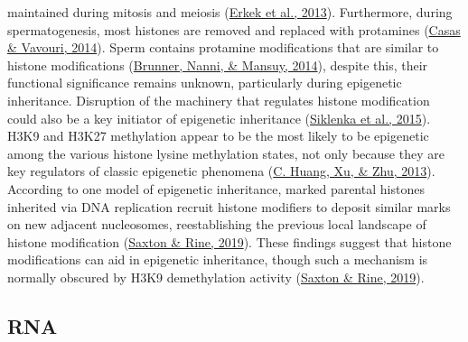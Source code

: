 \documentclass[12pt,twoside]{reedthesis}
\begin{document}
maintained during mitosis and meiosis (\protect\hyperlink{ref-erkek2013}{Erkek et al., 2013}). Furthermore, during
spermatogenesis, most histones are removed and replaced with protamines
(\protect\hyperlink{ref-casas2014}{Casas \& Vavouri, 2014}). Sperm contains protamine modifications that are similar to
histone modifications (\protect\hyperlink{ref-brunner2014}{Brunner, Nanni, \& Mansuy, 2014}), despite this, their functional
significance remains unknown, particularly during epigenetic
inheritance. Disruption of the machinery that regulates histone
modification could also be a key initiator of epigenetic inheritance
(\protect\hyperlink{ref-siklenka2015}{Siklenka et al., 2015}). H3K9 and H3K27 methylation appear to be the most likely
to be epigenetic among the various histone lysine methylation states,
not only because they are key regulators of classic epigenetic phenomena
(\protect\hyperlink{ref-huang2013}{C. Huang, Xu, \& Zhu, 2013}). According to one model of epigenetic inheritance, marked
parental histones inherited via DNA replication recruit histone
modifiers to deposit similar marks on new adjacent nucleosomes,
reestablishing the previous local landscape of histone modification
(\protect\hyperlink{ref-saxton2019}{Saxton \& Rine, 2019}). These findings suggest that histone modifications can aid
in epigenetic inheritance, though such a mechanism is normally obscured
by H3K9 demethylation activity (\protect\hyperlink{ref-saxton2019}{Saxton \& Rine, 2019}).

\hypertarget{rna}{%
\subsection*{RNA}\label{rna}}
\end{document}

